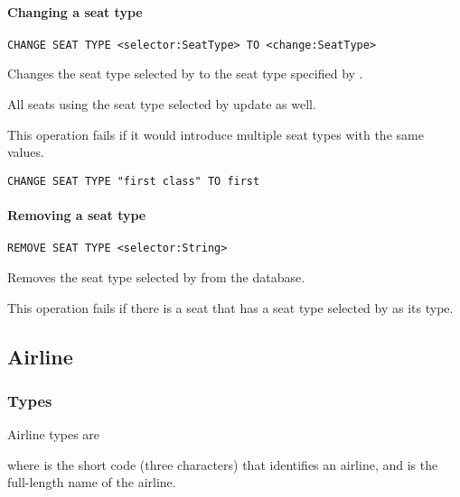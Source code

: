 \paragraph{Changing a seat type}
\begin{operation}
  \lstinline{CHANGE SEAT TYPE <selector:SeatType> TO <change:SeatType>}
\end{operation}
Changes the seat type selected by  to the seat type specified by
.

All seats using the seat type selected by  update as well.

This operation fails if it would introduce multiple seat types with the same
values.

\begin{texa}
  \begin{lstlisting}
CHANGE SEAT TYPE "first class" TO first
  \end{lstlisting}
\end{texa}

\paragraph{Removing a seat type}
\begin{operation}
  \lstinline{REMOVE SEAT TYPE <selector:String>}
\end{operation}
Removes the seat type selected by  from the database.

This operation fails if there is a seat that has a seat type selected by
 as its type.

\subsection{Airline}
\subsubsection{Types}
Airline types are
\begin{description}
  \item[] 
  \item[] 
\end{description}
where  is the short code (three characters) that identifies an
airline, and  is the full-length name of the airline.

